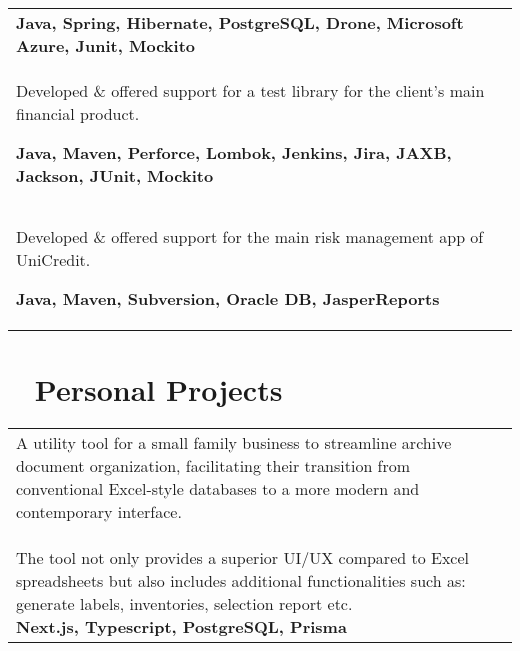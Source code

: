 \documentclass{modernsimplecv}
\newlength{\rightcolwidth}
\newlength{\leftcolwidth}
\begin{document}
\begin{paracol}{2}
{\begin{minipage}[t]{\leftcolwidth}
\begin{tabular}{p{} | p{}}
{                    \textbf{Java, Spring, Hibernate, PostgreSQL, Drone, Microsoft Azure, Junit, Mockito}
                } \\
                \cvevent{2018 -- 2019}{Luxoft}{Backend}{Bucharest, RO}{
                    \color{black!70}\footnotesize Developed \& offered support for a test library for the client's main financial product.\newline

                    \textbf{Java, Maven, Perforce, Lombok, Jenkins, Jira, JAXB, Jackson, JUnit, Mockito}
                } \\
                \cvevent{2015 -- 2018}{Unicredit}{Backend}{Iasi, RO}{
                    \color{black!70}\footnotesize Developed \& offered support for the main risk management app of UniCredit.\newline
                    
                    \color{black!70}\footnotesize \textbf{Java, Maven, Subversion, Oracle DB, JasperReports}
                }
            \end{tabular}
        \end{minipage}
    
    }
        \switchcolumn
    
        \begin{minipage}[t]{\rightcolwidth}
            \small
            \section*{\hspace{1mm}\faLaptop~ Personal Projects} 
            
            \begin{tabular}{p{3em} | p{}}
                \personalproject{2023}{Archive Utilitary}{
                    \color{black!70}\footnotesize A utility tool for a small family business to streamline archive document organization, facilitating their transition from conventional Excel-style databases to a more modern and contemporary interface.\newline\newline
                    \color{black!70}\footnotesize The tool not only provides a superior UI/UX compared to Excel spreadsheets but also includes additional functionalities such as: generate labels, inventories, selection report etc.\newline
                    \color{black!70}\footnotesize \textbf{Next.js, Typescript, PostgreSQL, Prisma}
                } \\
            \end{tabular}
        

\end{minipage}
\end{paracol}
\end{document}
